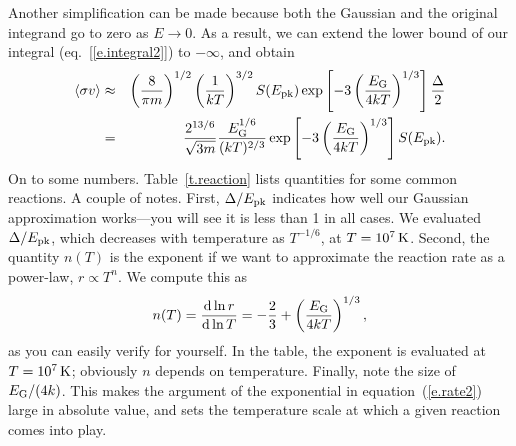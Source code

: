 Another simplification can be made because both the Gaussian and the original integrand go to zero as $E\to 0$.  As a result, we can extend the lower bound of our integral (eq.~[\ref{e.integral2}]) to $-\infty$, and obtain
\begin{eqnarray}\label{e.rate2}
\langle\sigma v\rangle &\approx& \left(\frac{8}{\pi m}\right)^{1/2}\left(\frac{1}{kT}\right)^{3/2} S(E_{\mathrm{pk}}) \exp\left[-3\left(\frac{E_{\mathrm{G}}}{4kT}\right)^{1/3}\right]\frac{\Delta}{2}\nonumber\\
 &=& \frac{2^{13/6}}{\sqrt{3m}}\frac{E_{\mathrm{G}}^{1/6}}{(kT)^{2/3}} \exp\left[-3\left(\frac{E_{\mathrm{G}}}{4kT}\right)^{1/3}\right]  S(E_{\mathrm{pk}}).
\end{eqnarray}
On to some numbers. Table~\ref{t.reaction} lists quantities for some common reactions. A couple of notes. First, $\Delta/E_{\mathrm{pk}}$ indicates how well our Gaussian approximation works---you will see it is less than 1 in all cases. We evaluated $\Delta/E_{\mathrm{pk}}$, which decreases with temperature as $T^{-1/6}$, at $T = 10^{7}\,\mathrm{K}$. Second, the quantity $n(T)$ is the exponent if we want to approximate the reaction rate as a power-law, $r\propto T^{n}$.  We compute this as 
\begin{equation}\label{e.exponent}
 n(T) = \frac{\mathrm{d}\ln r}{\mathrm{d}\ln T} = -\frac{2}{3} + \left(\frac{E_{\mathrm{G}}}{4kT}\right)^{1/3},
 \end{equation}
 as you can easily verify for yourself. In the table, the exponent is evaluated at $T = 10^{7}\,\mathrm{K}$; obviously $n$ depends on temperature. Finally, note the size of $E_{\mathrm{G}}/(4k)$.  This makes the argument of the exponential in equation~(\ref{e.rate2}) large in absolute value, and sets the temperature scale at which a given reaction comes into play.
 
